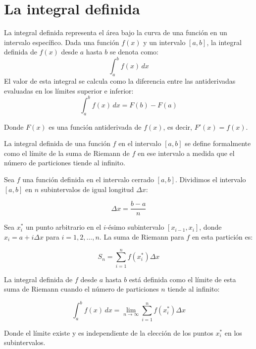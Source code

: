 \section{La integral definida}%

La integral definida representa el área bajo la curva de una función en un intervalo específico. Dada una función \( f(x) \) y un intervalo \([a, b]\), la integral definida de \( f(x) \) desde \( a \) hasta \( b \) se denota como:
\begin{equation*}
    \int_{a}^{b} f(x) \, dx
\end{equation*}
El valor de esta integral se calcula como la diferencia entre las antiderivadas evaluadas en los límites superior e inferior:
\begin{equation}
    \int_{a}^{b} f(x) \, dx = F(b) - F(a)
\end{equation}

Donde \( F(x) \) es una función antiderivada de \( f(x) \), es decir, \( F'(x) = f(x) \).

La integral definida de una función \( f \) en el intervalo \([a, b]\) se define formalmente como el límite de la suma de Riemann de \( f \) en ese intervalo a medida que el número de particiones tiende al infinito. 

\begin{definition}
    Sea \( f \) una función definida en el intervalo cerrado \([a, b]\). Dividimos el intervalo \([a, b]\) en \( n \) subintervalos de igual longitud \(\Delta x\):

\[
\Delta x = \frac{b - a}{n}
\]

Sea \( x_i^* \) un punto arbitrario en el \( i \)-ésimo subintervalo \([x_{i-1}, x_i]\), donde \( x_i = a + i \Delta x \) para \( i = 1, 2, \ldots, n \). La suma de Riemann para \( f \) en esta partición es:

\[
S_n = \sum_{i=1}^{n} f(x_i^*) \Delta x
\]

La integral definida de \( f \) desde \( a \) hasta \( b \) está definida como el límite de esta suma de Riemann cuando el número de particiones \( n \) tiende al infinito:

\[
\int_{a}^{b} f(x) \, dx = \lim_{n \to \infty} \sum_{i=1}^{n} f(x_i^*) \Delta x
\]

Donde el límite existe y es independiente de la elección de los puntos \( x_i^* \) en los subintervalos.
\end{definition}


